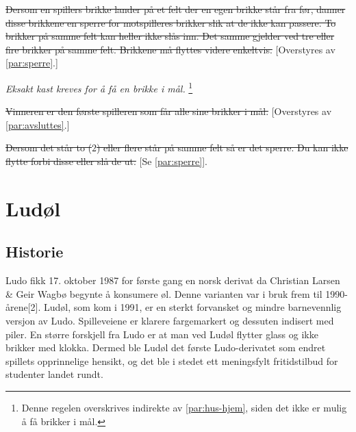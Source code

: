 \documentclass[10pt,a4paper,norsk,openany]{book}
\begin{document}
\begin{ludo}
  \item \sout{Dersom en spillers brikke lander på et felt der en egen brikke
    står fra før, danner disse brikkene en sperre for motspilleres brikker slik at
    de ikke kan passere. To brikker på samme felt kan heller ikke slås inn. Det
    samme gjelder ved tre eller fire brikker på samme felt. Brikkene må flyttes
    videre enkeltvis.} [Overstyres av \cref{par:sperre}.]
   
  \item \emph{Eksakt kast kreves for å få en brikke i mål.} \footnote{Denne
    regelen overskrives indirekte av \cref{par:hus-hjem}, siden det ikke er
    mulig å få brikker i mål.}
   
  \item \sout{Vinneren er den første spilleren som får alle sine brikker i mål.}
    [Overstyres av \cref{par:avsluttes}.]
  
  \item \sout{Dersom det står to ($2$) eller flere står på samme felt så er det
    sperre. Du kan ikke flytte forbi disse eller slå de ut.} [Se \cref{par:sperre}].
\end{ludo}

\chapter{Ludøl}

\section{Historie}

Ludo fikk 17. oktober 1987 for første gang en norsk derivat da Christian Larsen
\& Geir Wagbø begynte å konsumere øl. Denne varianten var i bruk frem til
1990-årene[2]. Ludøl, som kom i 1991, er en sterkt forvansket og mindre
barnevennlig versjon av Ludo. Spilleveiene er klarere fargemarkert og dessuten
indisert med piler. En større forskjell fra Ludo er at man ved Ludøl flytter
glass og ikke brikker med klokka. Dermed ble Ludøl det første Ludo-derivatet som
endret spillets opprinnelige hensikt, og det ble i stedet ett meningsfylt
fritidstilbud for studenter landet rundt.
\end{document}

